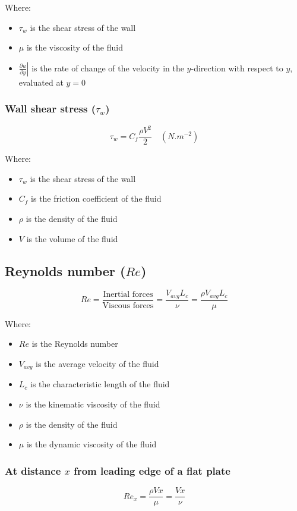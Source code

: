 \documentclass[11pt]{article}
\begin{document}
Where:
\begin{itemize}
\item \(\tau_w\) is the shear stress of the wall
\item \(\mu\) is the viscosity of the fluid
\item \(\left. \frac{\partial u}{\partial y} \right|\) is the rate of change of the velocity in the \(y\)-direction with respect to \(y\), evaluated at \(y = 0\)
\end{itemize}
\subsubsection{Wall shear stress (\(\tau_{w}\))}
\label{sec:org5878161}
\[\tau_{w} = C_f \frac{\rho V^2}{2} \quad (\unit{N.m^{-2}})\]

Where:
\begin{itemize}
\item \(\tau_w\) is the shear stress of the wall
\item \(C_f\) is the friction coefficient of the fluid
\item \(\rho\) is the density of the fluid
\item \(V\) is the volume of the fluid
\end{itemize}
\subsection{Reynolds number (\(Re\))}
\label{sec:org824413d}
\[Re = \frac{\text{Inertial forces}}{\text{Viscous forces}} = \frac{V_{avg} L_c}{\nu} = \frac{\rho V_{avg} L_c}{\mu}\]

Where:
\begin{itemize}
\item \(Re\) is the Reynolds number
\item \(V_{avg}\) is the average velocity of the fluid
\item \(L_c\) is the characteristic length of the fluid
\item \(\nu\) is the kinematic viscosity of the fluid
\item \(\rho\) is the density of the fluid
\item \(\mu\) is the dynamic viscosity of the fluid
\end{itemize}

 \newpage
\subsubsection{At distance \(x\) from leading edge of a flat plate}
\label{sec:org112c5f5}
\[Re_x = \frac{\rho V x}{\mu} = \frac{Vx}{\nu}\]
\end{document}
